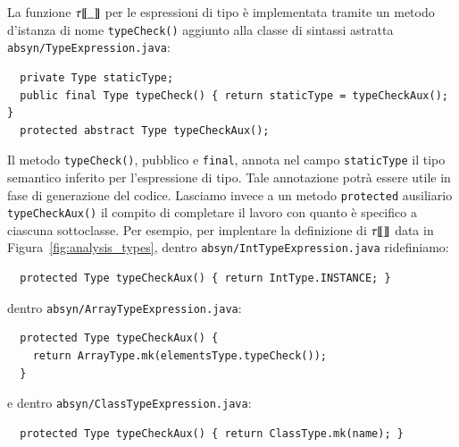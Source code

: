 La funzione ${\tau[\![{\_}]\!]}$ per le espressioni di tipo \`e implementata tramite
un metodo d'istanza di nome \texttt{typeCheck()} aggiunto alla
classe di sintassi astratta \texttt{absyn/TypeExpression.java}:
%
\begin{verbatim}
  private Type staticType;
  public final Type typeCheck() { return staticType = typeCheckAux(); }
  protected abstract Type typeCheckAux();
\end{verbatim}
%
Il metodo \texttt{typeCheck()}, pubblico e \texttt{final}, annota nel campo
\texttt{staticType} il tipo semantico inferito per l'espressione di tipo.
Tale annotazione potr\`a essere utile
in fase di generazione del codice. Lasciamo invece
a un metodo \texttt{protected} ausiliario \texttt{typeCheckAux()} il
compito di completare il lavoro con quanto \`e specifico a ciascuna
sottoclasse. Per esempio, per implentare la definizione di ${\tau[\![{}]\!]}$ data
in Figura~\ref{fig:analysis_types},
dentro \texttt{absyn/IntTypeExpression.java} ridefiniamo:
%
\begin{verbatim}
  protected Type typeCheckAux() { return IntType.INSTANCE; }
\end{verbatim}
%
dentro \texttt{absyn/ArrayTypeExpression.java}:
%
\begin{verbatim}
  protected Type typeCheckAux() {
    return ArrayType.mk(elementsType.typeCheck());
  }
\end{verbatim}
%
e dentro \texttt{absyn/ClassTypeExpression.java}:
%
\begin{verbatim}
  protected Type typeCheckAux() { return ClassType.mk(name); }
\end{verbatim}
